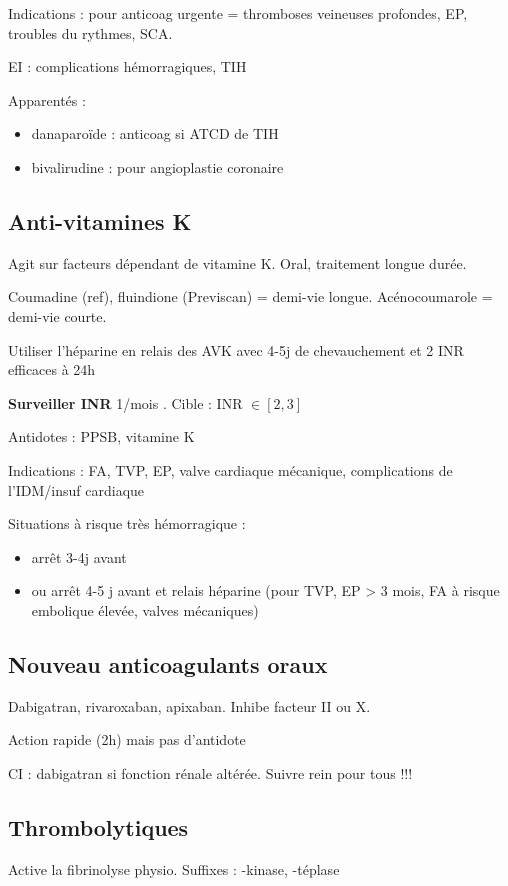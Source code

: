 \documentclass{article}
\begin{document}
Indications : pour anticoag urgente = thromboses veineuses profondes, EP,
troubles du rythmes, SCA.

EI : complications hémorragiques, \gls{TIH}

Apparentés :
\begin{itemize}
  \item danaparoïde : anticoag si ATCD de TIH
  \item bivalirudine : pour angioplastie coronaire
\end{itemize}

\subsection{Anti-vitamines K}
Agit sur facteurs dépendant de vitamine K. Oral, traitement longue durée.

Coumadine (ref), fluindione (Previscan) = demi-vie longue. Acénocoumarole = demi-vie courte.

Utiliser l'héparine en relais des AVK avec 4-5j de chevauchement et 2 INR
efficaces à 24h

\textbf{Surveiller INR}  1/mois \danger. Cible : INR $\in [2,3]$

Antidotes : PPSB, vitamine K

Indications : FA, TVP, EP, valve cardiaque mécanique,
complications de l'IDM/insuf cardiaque

Situations à risque très hémorragique :
\begin{itemize}
  \item arrêt 3-4j avant
  \item ou arrêt 4-5 j avant et relais héparine (pour TVP, EP > 3 mois, FA
    à risque embolique élevée, valves mécaniques)
\end{itemize}

\subsection{Nouveau anticoagulants oraux}
Dabigatran, rivaroxaban, apixaban. Inhibe facteur II ou X.

Action rapide (2h) mais pas d'antidote

CI : dabigatran si fonction rénale altérée. Suivre rein pour tous !!!

\subsection{Thrombolytiques}
Active la fibrinolyse physio. Suffixes : -kinase, -téplase
\end{document}
